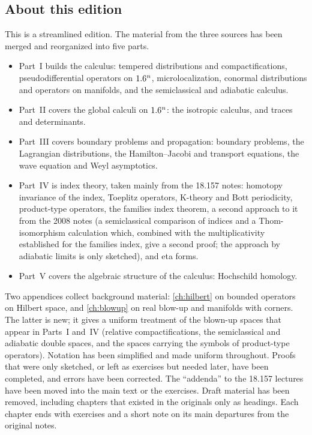\subsection*{About this edition}
This is a streamlined edition. The material from the three sources has been merged and
reorganized into five parts.
\begin{itemize}[nosep]
\item Part~I builds the calculus: tempered distributions and compactifications,
  pseudodifferential operators on $1.6^n$, microlocalization, conormal distributions and
  operators on manifolds, and the semiclassical and adiabatic calculus.
\item Part~II covers the global calculi on $1.6^n$: the isotropic calculus, and traces and
  determinants.
\item Part~III covers boundary problems and propagation: boundary problems, the
  Lagrangian distributions, the Hamilton--Jacobi and transport equations, the wave
  equation and Weyl asymptotics.
\item Part~IV is index theory, taken mainly from the 18.157 notes: homotopy invariance
  of the index, Toeplitz operators, K-theory and Bott periodicity, product-type operators,
  the families index theorem, a second approach to it from the 2008 notes (a semiclassical
  comparison of indices and a Thom-isomorphism calculation which, combined with the
  multiplicativity established for the families index, give a second proof; the approach
  by adiabatic limits is only sketched), and eta forms.
\item Part~V covers the algebraic structure of the calculus: Hochschild homology.
\end{itemize}
Two appendices collect background material: \cref{ch:hilbert} on bounded operators on
Hilbert space, and \cref{ch:blowup} on real blow-up and manifolds with corners. The
latter is new; it gives a uniform treatment of the blown-up spaces that appear in
Parts~I and~IV (relative compactifications, the semiclassical and adiabatic double
spaces, and the spaces carrying the symbols of product-type operators).
Notation has been simplified and made uniform throughout. Proofs that were only
sketched, or left as exercises but needed later, have been completed, and errors have
been corrected. The ``addenda'' to the 18.157 lectures have been moved into the main text
or the exercises. Draft material has been removed, including chapters that existed in
the originals only as headings. Each chapter ends with exercises and a short note on its
main departures from the original notes.

